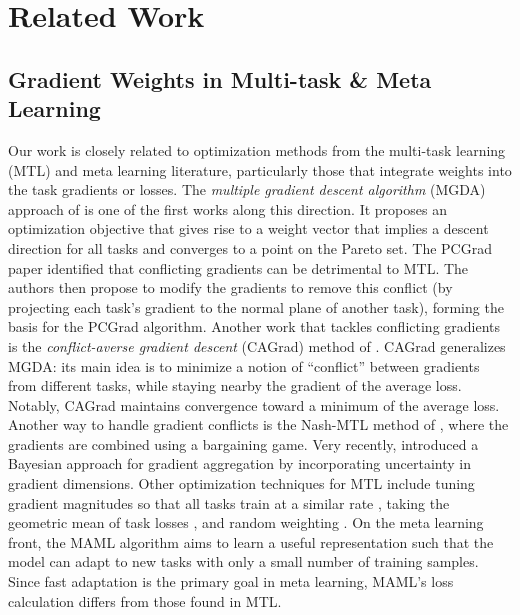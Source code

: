 \section{Related Work}
\subsection{Gradient Weights in Multi-task \& Meta Learning}
Our work is closely related to optimization methods from the multi-task learning (MTL) and meta learning literature, particularly those that integrate weights into the task gradients or losses. The \emph{multiple gradient descent algorithm} (MGDA) approach of \citet{desideri2012multiple, sener2018multi,zhang2024convergence} is one of the first works along this direction. It proposes an optimization objective that gives rise to a weight vector that implies a descent direction for all tasks and converges to a point on the Pareto set. 
The PCGrad paper \cite{yu2020gradient} identified that conflicting gradients can be detrimental to MTL. The authors then propose to modify the gradients to remove this conflict (by projecting each task's gradient to the normal plane of another task), forming the basis for the PCGrad algorithm. Another work that tackles conflicting gradients is the \emph{conflict-averse gradient descent} (CAGrad) method of \cite{liu2021conflict}. CAGrad generalizes MGDA: its main idea is to minimize a notion of ``conflict'' between gradients from different tasks, while staying nearby the gradient of the average loss. Notably, CAGrad maintains convergence toward a minimum of the average loss. Another way to handle gradient conflicts is the Nash-MTL method of \citet{navon2022multi}, where the gradients are combined using a bargaining game. Very recently, \citet{achituve2024bayesian} introduced a Bayesian approach for gradient aggregation by incorporating uncertainty in gradient dimensions. Other optimization techniques for MTL include tuning gradient magnitudes so that all tasks train at a similar rate \citep{chen2018gradnorm}, taking the geometric mean of task losses \citep{chennupati2019multinet++}, and random weighting \citep{lin2021reasonable}. On the meta learning front, the MAML algorithm \citep{finn2019online} aims to learn a useful representation such that the model can adapt to new tasks with only a small number of training samples. Since fast adaptation is the primary goal in meta learning, MAML's loss calculation differs from those found in MTL. 

